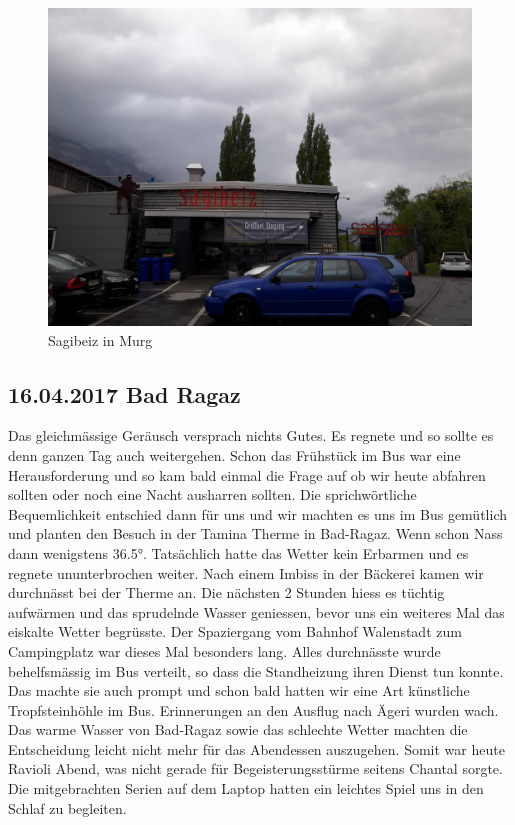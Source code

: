 \begin{figure}[H]
    \centering
    \includegraphics[width=\textwidth]{../Bilder/Walensee/31.jpg}
    \caption{Sagibeiz in Murg}
    \label{img:Sagibeiz}
\end{figure}

\subsection{16.04.2017 Bad Ragaz} 
Das gleichmässige Geräusch versprach nichts Gutes.
Es regnete und so sollte es denn ganzen Tag auch weitergehen.
Schon das Frühstück im Bus war eine Herausforderung und so kam bald einmal die Frage auf ob wir heute abfahren sollten oder noch eine Nacht ausharren sollten.
Die sprichwörtliche Bequemlichkeit entschied dann für uns und wir machten es uns im Bus gemütlich und planten den Besuch in der Tamina Therme in Bad-Ragaz.
Wenn schon Nass dann wenigstens 36.5°.
Tatsächlich hatte das Wetter kein Erbarmen und es regnete ununterbrochen weiter.
Nach einem Imbiss in der Bäckerei kamen wir durchnässt bei der Therme an.
Die nächsten 2 Stunden hiess es tüchtig aufwärmen und das sprudelnde Wasser geniessen, bevor uns ein weiteres Mal das eiskalte Wetter begrüsste.
Der Spaziergang vom Bahnhof Walenstadt zum Campingplatz war dieses Mal besonders lang. 
Alles durchnässte wurde behelfsmässig im Bus verteilt, so dass die Standheizung ihren Dienst tun konnte.
Das machte sie auch prompt und schon bald hatten wir eine Art künstliche Tropfsteinhöhle im Bus.
Erinnerungen an den Ausflug nach Ägeri wurden wach.
Das warme Wasser von Bad-Ragaz sowie das schlechte Wetter machten die Entscheidung leicht nicht mehr für das Abendessen auszugehen.
Somit war heute Ravioli Abend, was nicht gerade für Begeisterungsstürme seitens Chantal sorgte.
Die mitgebrachten Serien auf dem Laptop hatten ein leichtes Spiel uns in den Schlaf zu begleiten.

